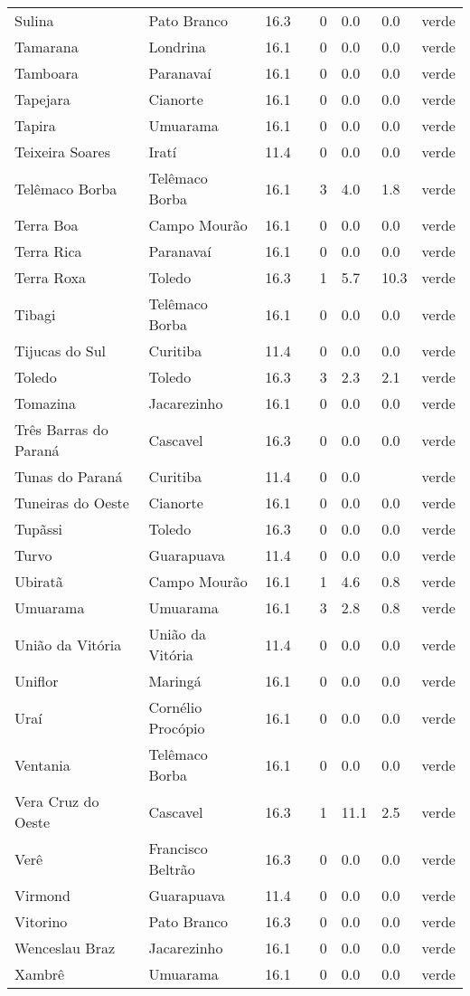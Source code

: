 \begin{longtable}{l|lllllll}
  Sulina & Pato Branco & 16.3 &  & 0 & 0.0 & 0.0 & verde \\ 
  Tamarana & Londrina & 16.1 &  & 0 & 0.0 & 0.0 & verde \\ 
  Tamboara & Paranavaí & 16.1 &  & 0 & 0.0 & 0.0 & verde \\ 
  Tapejara & Cianorte & 16.1 &  & 0 & 0.0 & 0.0 & verde \\ 
  Tapira & Umuarama & 16.1 &  & 0 & 0.0 & 0.0 & verde \\ 
  Teixeira Soares & Iratí & 11.4 &  & 0 & 0.0 & 0.0 & verde \\ 
  Telêmaco Borba & Telêmaco Borba & 16.1 &  & 3 & 4.0 & 1.8 & verde \\ 
  Terra Boa & Campo Mourão & 16.1 &  & 0 & 0.0 & 0.0 & verde \\ 
  Terra Rica & Paranavaí & 16.1 &  & 0 & 0.0 & 0.0 & verde \\ 
  Terra Roxa & Toledo & 16.3 &  & 1 & 5.7 & 10.3 & verde \\ 
  Tibagi & Telêmaco Borba & 16.1 &  & 0 & 0.0 & 0.0 & verde \\ 
  Tijucas do Sul & Curitiba & 11.4 &  & 0 & 0.0 & 0.0 & verde \\ 
  Toledo & Toledo & 16.3 &  & 3 & 2.3 & 2.1 & verde \\ 
  Tomazina & Jacarezinho & 16.1 &  & 0 & 0.0 & 0.0 & verde \\ 
  Três Barras do Paraná & Cascavel & 16.3 &  & 0 & 0.0 & 0.0 & verde \\ 
  Tunas do Paraná & Curitiba & 11.4 &  & 0 & 0.0 &  & verde \\ 
  Tuneiras do Oeste & Cianorte & 16.1 &  & 0 & 0.0 & 0.0 & verde \\ 
  Tupãssi & Toledo & 16.3 &  & 0 & 0.0 & 0.0 & verde \\ 
  Turvo & Guarapuava & 11.4 &  & 0 & 0.0 & 0.0 & verde \\ 
  Ubiratã & Campo Mourão & 16.1 &  & 1 & 4.6 & 0.8 & verde \\ 
  Umuarama & Umuarama & 16.1 &  & 3 & 2.8 & 0.8 & verde \\ 
  União da Vitória & União da Vitória & 11.4 &  & 0 & 0.0 & 0.0 & verde \\ 
  Uniflor & Maringá & 16.1 &  & 0 & 0.0 & 0.0 & verde \\ 
  Uraí & Cornélio Procópio & 16.1 &  & 0 & 0.0 & 0.0 & verde \\ 
  Ventania & Telêmaco Borba & 16.1 &  & 0 & 0.0 & 0.0 & verde \\ 
  Vera Cruz do Oeste & Cascavel & 16.3 &  & 1 & 11.1 & 2.5 & verde \\ 
  Verê & Francisco Beltrão & 16.3 &  & 0 & 0.0 & 0.0 & verde \\ 
  Virmond & Guarapuava & 11.4 &  & 0 & 0.0 & 0.0 & verde \\ 
  Vitorino & Pato Branco & 16.3 &  & 0 & 0.0 & 0.0 & verde \\ 
  Wenceslau Braz & Jacarezinho & 16.1 &  & 0 & 0.0 & 0.0 & verde \\ 
  Xambrê & Umuarama & 16.1 &  & 0 & 0.0 & 0.0 & verde \\ 
  \hline
\end{longtable}
